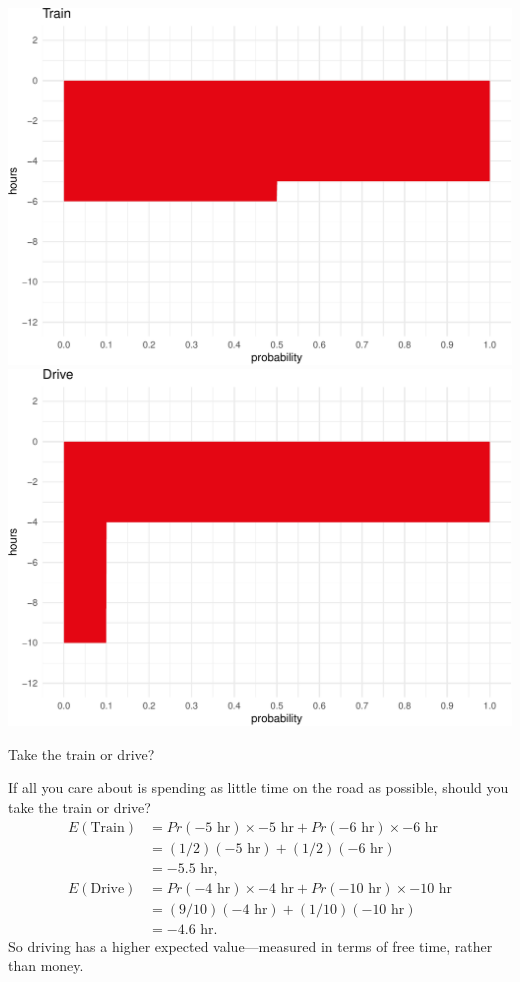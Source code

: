 \documentclass[justified]{tufte-book}
\newcommand{\p}{Pr}
\newcommand{\E}{E}
\theoremstyle{definition}
\theoremstyle{definition}
\theoremstyle{definition}
\theoremstyle{definition}
\theoremstyle{remark}
\begin{document}
\begin{marginfigure}
\includegraphics{_main_files/figure-latex/unnamed-chunk-93-1} \includegraphics{_main_files/figure-latex/unnamed-chunk-93-2} \caption[Take the train or drive?]{Take the train or drive?}\label{fig:unnamed-chunk-93}
\end{marginfigure}

If all you care about is spending as little time on the road as possible, should you take the train or drive?
\[
  \begin{aligned}
    \E(\mbox{Train}) &= \p(-5{\mbox{ hr}}) \times -5{\mbox{ hr}}+ \p(-6{\mbox{ hr}}) \times -6{\mbox{ hr}}\\
                     &= (1/2)(-5{\mbox{ hr}}) + (1/2)(-6{\mbox{ hr}})\\
                     &= -5.5{\mbox{ hr}},\\
    \E(\mbox{Drive}) &= \p(-4{\mbox{ hr}}) \times -4{\mbox{ hr}}+ \p(-10{\mbox{ hr}}) \times -10{\mbox{ hr}}\\
                     &= (9/10)(-4{\mbox{ hr}}) + (1/10)(-10{\mbox{ hr}})\\
                     &= -4.6{\mbox{ hr}}.
  \end{aligned}
\]
So driving has a higher expected value---measured in terms of free time, rather than money.
\end{document}
